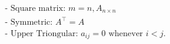 \documentclass[11pt,a4paper]{article}
\begin{document}

$$
\begin{aligned}
&\text { - Square matrix: } m=n, A_{n \times n} \\
&\text { - Symmetric: } A^{\top}=A \\
&\text { - Upper Triongular: } a_{i j}=0 \text { whenever } i<j \text {. }
\end{aligned}
$$
\end{document}
